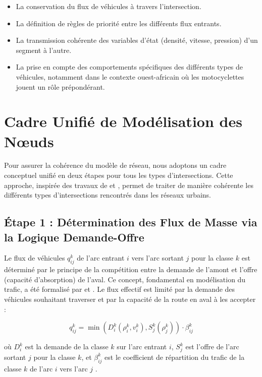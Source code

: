 \begin{itemize}
    \item La conservation du flux de véhicules à travers l'intersection.
    \item La définition de règles de priorité entre les différents flux entrants.
    \item La transmission cohérente des variables d'état (densité, vitesse, pression) d'un segment à l'autre.
    \item La prise en compte des comportements spécifiques des différents types de véhicules, notamment dans le contexte ouest-africain où les motocyclettes jouent un rôle prépondérant.
\end{itemize}



\section{Cadre Unifié de Modélisation des Nœuds}
Pour assurer la cohérence du modèle de réseau, nous adoptons un cadre conceptuel unifié en deux étapes pour tous les types d'intersections. Cette approche, inspirée des travaux de \cite{HoldenRisebro2015} et \cite{AndreianovPanov2012}, permet de traiter de manière cohérente les différents types d'intersections rencontrés dans les réseaux urbains.

\subsection{Étape 1 : Détermination des Flux de Masse via la Logique Demande-Offre}
Le flux de véhicules $ q_{ij}^k $ de l'arc entrant $ i $ vers l'arc sortant $ j $ pour la classe $ k $ est déterminé par le principe de la compétition entre la demande de l'amont et l'offre (capacité d'absorption) de l'aval. Ce concept, fondamental en modélisation du trafic, a été formalisé par \cite{Daganzo1995} et \cite{Lebacque1996}. Le flux effectif est limité par la demande des véhicules souhaitant traverser et par la capacité de la route en aval à les accepter :

\[
q_{ij}^k = \min\left(D_i^k(\rho_i^k, v_i^k), S_j^k(\rho_j^k)\right) \cdot \beta_{ij}^k
\]

où $ D_i^k $ est la demande de la classe $ k $ sur l'arc entrant $ i $, $ S_j^k $ est l'offre de l'arc sortant $ j $ pour la classe $ k $, et $ \beta_{ij}^k $ est le coefficient de répartition du trafic de la classe $ k $ de l'arc $ i $ vers l'arc $ j $ \cite{CocliteGaravelloPiccoli2005}.

